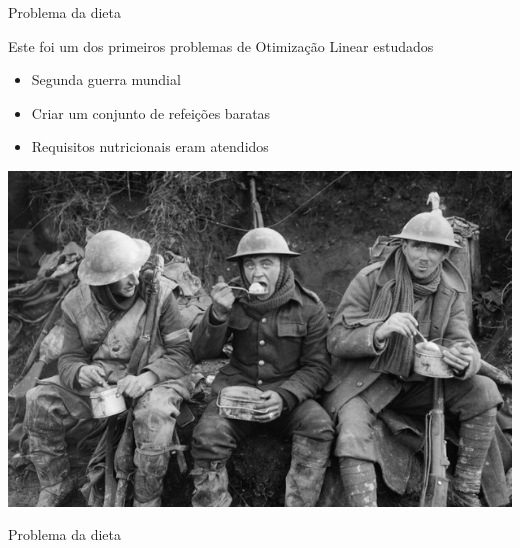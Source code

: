 \documentclass[compress,mathserif]{beamer}
\begin{document}

\begin{frame}{Problema da dieta}

Este foi um dos primeiros problemas de Otimização Linear estudados \href{https://neos-guide.org/content/diet-problem}{}

\begin{itemize}
    \item Segunda guerra mundial
    \item Criar um conjunto de refeições baratas
    \item Requisitos nutricionais eram atendidos
\end{itemize}

\centering \includegraphics[width=\textwidth]{images/soldier_eating.jpg}

\end{frame}


\begin{frame}{Problema da dieta}

\begin{table}[]
\def\arraystretch{1.8}
\centering
{}
\end{table}

\end{frame}
\end{document}
